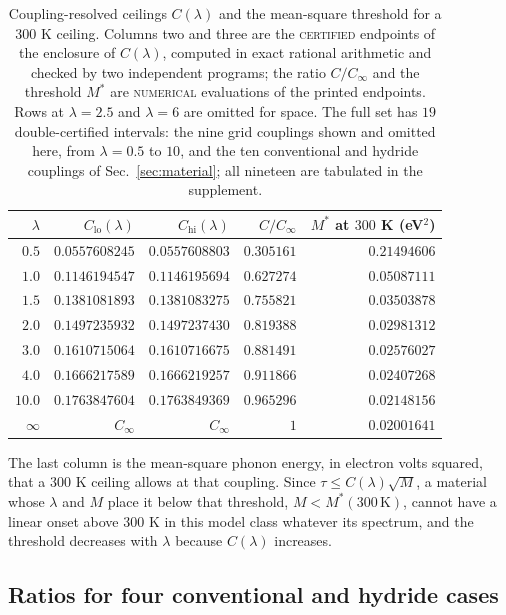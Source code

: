 \documentclass[aps,10pt,superscriptaddress,floatfix,amsmath,amssymb,nofootinbib]{revtex4-2}
\newcommand{\Cinf}{C_\infty}
\newcommand{\CERT}{\textsc{certified}}
\newcommand{\NUM}{\textsc{numerical}}
\begin{document}
\begin{table}[h]
\caption{Coupling-resolved ceilings $C(\lambda)$ and the mean-square threshold for a
$300$ K ceiling. Columns two and three are the \CERT{} endpoints of the enclosure of
$C(\lambda)$, computed in exact rational arithmetic and checked by two independent programs;
the ratio $C/\Cinf$ and the threshold $M^{*}$ are \NUM{} evaluations of the printed
endpoints. Rows at $\lambda=2.5$ and $\lambda=6$ are omitted for space. The full set has
$19$ double-certified intervals: the nine grid couplings shown and omitted here, from
$\lambda=0.5$ to $10$, and the ten conventional and hydride couplings of
Sec.~\ref{sec:material}; all nineteen are tabulated in the supplement.\label{tab:clambda}}
\small
\begin{tabular}{@{}rrrrr@{}}
\hline
$\lambda$ & $C_{\mathrm{lo}}(\lambda)$ & $C_{\mathrm{hi}}(\lambda)$ & $C/\Cinf$ & $M^{*}$ at $300$ K (eV$^{2}$) \\
\hline
$0.5$ & $0.0557608245$ & $0.0557608803$ & $0.305161$ & $0.21494606$ \\
$1.0$ & $0.1146194547$ & $0.1146195694$ & $0.627274$ & $0.05087111$ \\
$1.5$ & $0.1381081893$ & $0.1381083275$ & $0.755821$ & $0.03503878$ \\
$2.0$ & $0.1497235932$ & $0.1497237430$ & $0.819388$ & $0.02981312$ \\
$3.0$ & $0.1610715064$ & $0.1610716675$ & $0.881491$ & $0.02576027$ \\
$4.0$ & $0.1666217589$ & $0.1666219257$ & $0.911866$ & $0.02407268$ \\
$10.0$ & $0.1763847604$ & $0.1763849369$ & $0.965296$ & $0.02148156$ \\
$\infty$ & $\Cinf$ & $\Cinf$ & $1$ & $0.02001641$ \\
\hline
\end{tabular}
\end{table}

The last column is the mean-square phonon energy, in electron volts squared, that a
$300$ K ceiling allows at that coupling. Since $\tau\le C(\lambda)\sqrt M$, a material whose
$\lambda$ and $M$ place it below that threshold, $M<M^{*}(300\,\mathrm{K})$, cannot have a
linear onset above $300$ K in this model class whatever its spectrum, and the threshold
decreases with $\lambda$ because $C(\lambda)$ increases.

\subsection{Ratios for four conventional and hydride cases}
\end{document}
